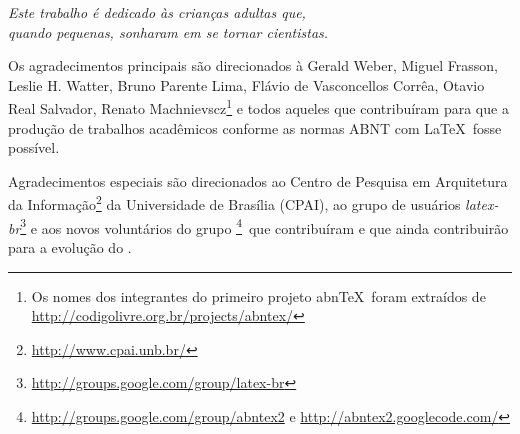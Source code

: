 

\imprimircapa

\imprimirfolhaderosto*




%
% 
\imprimirfolhadeaprovacao

\begin{dedicatoria}
   \vspace*{\fill}
   \centering
   \noindent
   \textit{ Este trabalho é dedicado às crianças adultas que,\\
   quando pequenas, sonharam em se tornar cientistas.} \vspace*{\fill}
\end{dedicatoria}

\begin{agradecimentos}
Os agradecimentos principais são direcionados à Gerald Weber, Miguel Frasson,
Leslie H. Watter, Bruno Parente Lima, Flávio de Vasconcellos Corrêa, Otavio Real
Salvador, Renato Machnievscz\footnote{Os nomes dos integrantes do primeiro
projeto abn\TeX\ foram extraídos de
\url{http://codigolivre.org.br/projects/abntex/}} e todos aqueles que
contribuíram para que a produção de trabalhos acadêmicos conforme
as normas ABNT com \LaTeX\ fosse possível.

Agradecimentos especiais são direcionados ao Centro de Pesquisa em Arquitetura
da Informação\footnote{\url{http://www.cpai.unb.br/}} da Universidade de
Brasília (CPAI), ao grupo de usuários
\emph{latex-br}\footnote{\url{http://groups.google.com/group/latex-br}} e aos
novos voluntários do grupo
\emph{\abnTeX}\footnote{\url{http://groups.google.com/group/abntex2} e
\url{http://abntex2.googlecode.com/}}~que contribuíram e que ainda
contribuirão para a evolução do \abnTeX.

\end{agradecimentos}

